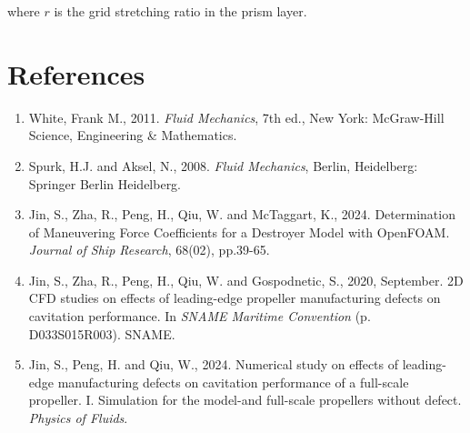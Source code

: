 \documentclass[12pt,a4paper]{article}
\begin{document}
where $r$ is the grid stretching ratio in the prism layer.

\section{References}
\begin{enumerate}
    \item White, Frank M., 2011. \textit{Fluid Mechanics}, 7th ed., New York: McGraw-Hill Science, Engineering \& Mathematics.
    \item Spurk, H.J. and Aksel, N., 2008. \textit{Fluid Mechanics}, Berlin, Heidelberg: Springer Berlin Heidelberg.
    \item Jin, S., Zha, R., Peng, H., Qiu, W. and McTaggart, K., 2024. Determination of Maneuvering Force Coefficients for a Destroyer Model with OpenFOAM. \textit{Journal of Ship Research}, 68(02), pp.39-65.
    \item Jin, S., Zha, R., Peng, H., Qiu, W. and Gospodnetic, S., 2020, September. 2D CFD studies on effects of leading-edge propeller manufacturing defects on cavitation performance. In \textit{SNAME Maritime Convention} (p. D033S015R003). SNAME.
    \item Jin, S., Peng, H. and Qiu, W., 2024. Numerical study on effects of leading-edge manufacturing defects on cavitation performance of a full-scale propeller. I. Simulation for the model-and full-scale propellers without defect. \textit{Physics of Fluids}.
\end{enumerate}
\end{document}
